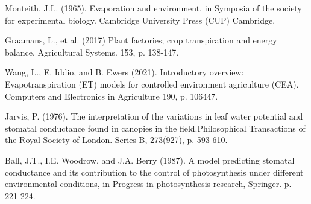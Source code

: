   Monteith, J.L. (1965). Evaporation and environment. in Symposia of the society for experimental biology. Cambridge University Press (CUP) Cambridge.

  Graamans, L., et al. (2017) Plant factories; crop transpiration and energy balance. Agricultural Systems. 153, p. 138-147.

  Wang, L., E. Iddio, and B. Ewers (2021). Introductory overview: Evapotranspiration (ET) models for controlled environment agriculture (CEA). Computers and Electronics in Agriculture 190, p. 106447.

  Jarvis, P. (1976). The interpretation of the variations in leaf water potential and stomatal conductance found in canopies in the field.Philosophical Transactions of the Royal Society of London. Series B, 273(927), p. 593-610.

  Ball, J.T., I.E. Woodrow, and J.A. Berry (1987). A model predicting stomatal conductance and its contribution to the control of photosynthesis under different environmental conditions, in Progress in photosynthesis research, Springer. p. 221-224.

